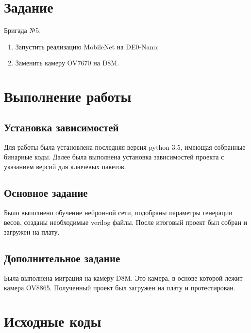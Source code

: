 \documentclass[a4paper,14pt]{article}
\begin{document}
    
    \tableofcontents
    \pagebreak


    \section{Задание}

    Бригада №5.

    \begin{enumerate}
        \item Запустить реализацию MobileNet на DE0-Nano;
        \item Заменить камеру OV7670 на D8M.
    \end{enumerate}


    \section{Выполнение работы}

    \subsection{Установка зависимостей}

	Для работы была установлена последняя версия python 3.5, имеющая собранные бинарные коды.
	Далее была выполнена установка зависимостей проекта с указанием версий для ключевых пакетов.
	
	{\small {}}

	\subsection{Основное задание}
	
	Было выполнено обучение нейронной сети, подобраны параметры генерации весов, созданы необходимые verilog файлы.
	После итоговый проект был собран и загружен на плату.
	
	\subsection{Дополнительное задание}
	
	Была выполнена миграция на камеру D8M. 
	Это камера, в основе которой лежит камера OV8865.
	Полученный проект был загружен на плату и протестирован.

    \section{Исходные коды}
\end{document}
